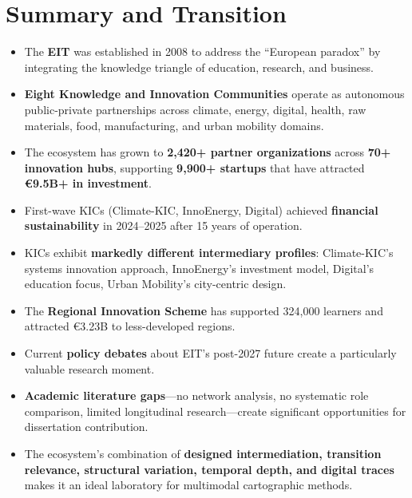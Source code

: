 \documentclass[../main.tex]{subfiles}
\begin{document}
\section*{Summary and Transition}

\begin{summarybox}
\begin{itemize}[leftmargin=*, itemsep=0.3em]
\item The \textbf{EIT} was established in 2008 to address the ``European paradox'' by integrating the knowledge triangle of education, research, and business.

\item \textbf{Eight Knowledge and Innovation Communities} operate as autonomous public-private partnerships across climate, energy, digital, health, raw materials, food, manufacturing, and urban mobility domains.

\item The ecosystem has grown to \textbf{2,420+ partner organizations} across \textbf{70+ innovation hubs}, supporting \textbf{9,900+ startups} that have attracted \textbf{€9.5B+ in investment}.

\item First-wave KICs (Climate-KIC, InnoEnergy, Digital) achieved \textbf{financial sustainability} in 2024--2025 after 15 years of operation.

\item KICs exhibit \textbf{markedly different intermediary profiles}: Climate-KIC's systems innovation approach, InnoEnergy's investment model, Digital's education focus, Urban Mobility's city-centric design.

\item The \textbf{Regional Innovation Scheme} has supported 324,000 learners and attracted €3.23B to less-developed regions.

\item Current \textbf{policy debates} about EIT's post-2027 future create a particularly valuable research moment.

\item \textbf{Academic literature gaps}---no network analysis, no systematic role comparison, limited longitudinal research---create significant opportunities for dissertation contribution.

\item The ecosystem's combination of \textbf{designed intermediation, transition relevance, structural variation, temporal depth, and digital traces} makes it an ideal laboratory for multimodal cartographic methods.
\end{itemize}
\end{summarybox}
\end{document}
